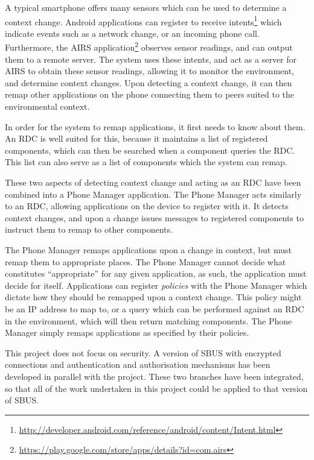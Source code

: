 \documentclass[12pt,twoside,notitlepage]{report}
\begin{document}
A typical smartphone offers many sensors which can be used to determine a context change. 
Android applications can register to receive intents\footnote{\url{http://developer.android.com/reference/android/content/Intent.html}} which indicate events such as a network change, or an incoming phone call. 
Furthermore, the AIRS application\footnote{\url{https://play.google.com/store/apps/details?id=com.airs}} observes sensor readings, and can output them to a remote server.
The system uses these intents, and act as a server for AIRS to obtain these sensor readings, allowing it to monitor the environment, and determine context changes. 
Upon detecting a context change, it can then remap other applications on the phone connecting them to peers suited to the environmental context. 

In order for the system to remap applications, it first needs to know about them. 
An RDC is well suited for this, because it maintains a list of registered components, which can then be searched when a component queries the RDC. 
This list can also serve as a list of components which the system can remap.

These two aspects of detecting context change and acting as an RDC have been combined into a Phone Manager application. 
The Phone Manager acts similarly to an RDC, allowing applications on the device to register with it. 
It detects context changes, and upon a change issues messages to registered components to instruct them to remap to other components.

The Phone Manager remaps applications upon a change in context, but must remap them to appropriate places. 
The Phone Manager cannot decide what constitutes ``appropriate'' for any given application, as such, the application must decide for itself. 
Applications can register {\sl policies} with the Phone Manager which dictate how they should be remapped upon a context change. 
This policy might be an IP address to map to, or a query which can be performed against an RDC in the environment, which will then return matching components. 
The Phone Manager simply remaps applications as specified by their policies.

This project does not focus on security. 
A version of SBUS with encrypted connections and authentication and authorisation mechanisms has been developed in parallel with the project. 
These two branches have been integrated, so that all of the work undertaken in this project could be applied to that version of SBUS.
\end{document}
